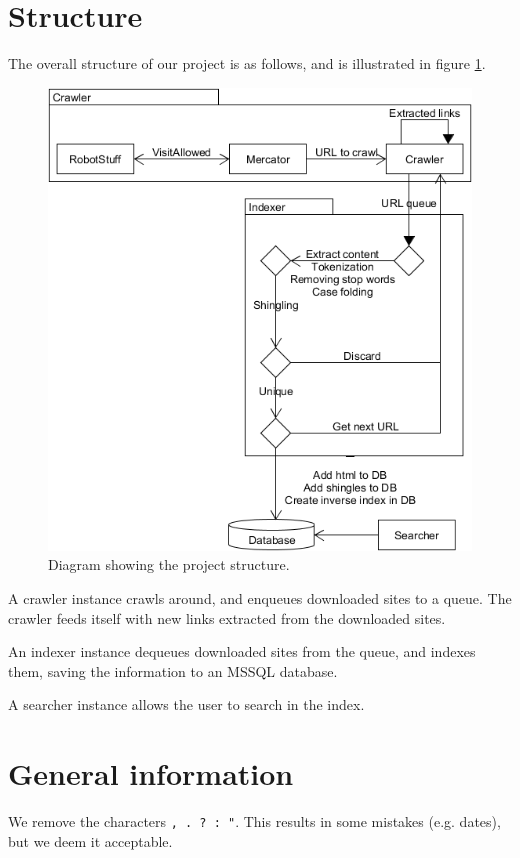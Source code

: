 \section{Structure}
The overall structure of our project is as follows, and is illustrated in figure \ref{fig:structure}.
\begin{figure}
    \includegraphics[width=\textwidth]{diagrams/structure}
    \caption{Diagram showing the project structure.}
    \label{fig:structure}
\end{figure}

A crawler instance crawls around, and enqueues downloaded sites to a queue. The crawler feeds itself with new links extracted from the downloaded sites.

An indexer instance dequeues downloaded sites from the queue, and indexes them, saving the information to an MSSQL database.

A searcher instance allows the user to search in the index.

\section{General information}\label{sec:rem-chars}
We remove the characters \texttt{, . ? : "}. This results in some mistakes (e.g. dates), but we deem it acceptable.
